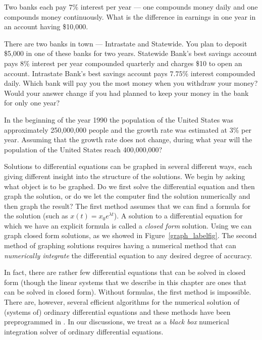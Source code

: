 \begin{exercise} \label{c3.1.8}
Two banks each pay $7\%$ interest per year --- one compounds money
daily and one compounds money continuously.  What is the difference
in earnings in one year in an account having \$10,000.
\end{exercise}

\begin{exercise} \label{c3.1.9}
There are two banks in town --- Intrastate and Statewide.  You plan
to deposit \$5,000 in one of these banks for two years.  Statewide Bank's
best savings account pays $8\%$ interest per year compounded quarterly
and charges \$10 to open an account.  Intrastate Bank's best savings
account pays $7.75\%$ interest compounded daily.  Which bank will
pay you the most money when you withdraw your money?  Would your
answer change if you had planned to keep your money in the bank
for only one year?
\end{exercise}

\begin{exercise} \label{c3.1.10}
In the beginning of the year 1990 the population of the United States was
approximately 250,000,000 people and the growth rate was estimated at $3\%$
per year.  Assuming that the growth rate does not change, during what year
will the population of the United States reach 400,000,000?
\end{exercise}


\label{S:3.2}

Solutions to differential equations can be graphed in several
different ways, each giving different insight into the structure
of the solutions.  We begin by asking what object is to be
graphed.  Do we first solve the differential equation and then
graph the solution, or do we let the computer find the solution
numerically and then graph the result?  The first method assumes
that we can find a formula for the solution (such as
$x(t)=x_0e^{\lambda t}$).  A solution to a differential equation
for which we have an explicit formula is called a {\em closed
form\/} solution.  Using \Matlab we
can graph closed form solutions, as we showed in
Figure~\ref{graph_labelfig}. The second method of graphing
solutions requires having a numerical method that can {\em
numerically integrate\/} the differential equation to any
desired degree of accuracy.

In fact, there are rather few differential equations that can be
solved in closed form (though the linear systems that we
describe in this chapter are ones that can be solved in closed
form).  Without formulas, the first method is impossible.  There
are, however, several efficient algorithms for the numerical
solution of (systems of) ordinary differential equations and
these methods have been preprogrammed in \Matlabp.  In our
discussions, we treat \Matlab as a {\em black box\/} numerical
integration solver of ordinary differential equations.

